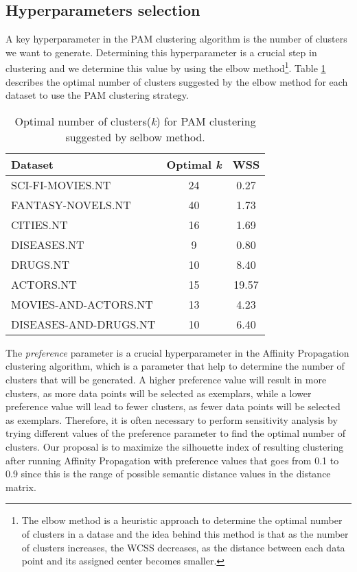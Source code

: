 \documentclass{ieeeaccess}
\begin{document}
\subsection{Hyperparameters selection}

A key hyperparameter in the PAM clustering algorithm is the number of clusters 
we want to generate. Determining this hyperparameter is
a crucial step in clustering and we determine this value by using the elbow 
method\footnote{The elbow method is a heuristic approach to determine the 
optimal number of clusters in a datase and the idea behind this method is that
as the number of clusters increases, the WCSS decreases, as the distance between 
each data point and its assigned center becomes smaller.}. Table \ref{tab:elbow_numbers} describes the optimal number of clusters 
suggested by the elbow method for each dataset to use the PAM clustering strategy.

\begin{table}[!htb]
\caption{Optimal number of clusters(\textit{k}) for PAM clustering suggested by 
selbow method.}
\label{tab:elbow_numbers}
\centering
\begin{tabular}{lcc}
     \toprule
     \textbf{Dataset} & 
     \textbf{Optimal \textit{k}} &
     \textbf{WSS}
     \\
     \midrule
     SCI-FI-MOVIES.NT & 24 & 0.27 \\
     FANTASY-NOVELS.NT & 40 & 1.73 \\
     CITIES.NT & 16 & 1.69 \\
     DISEASES.NT & 9 & 0.80 \\
     DRUGS.NT & 10 & 8.40 \\
     ACTORS.NT & 15 & 19.57 \\
     MOVIES-AND-ACTORS.NT & 13 & 4.23 \\
     DISEASES-AND-DRUGS.NT & 10 & 6.40  \\ 
     \bottomrule
\end{tabular}
\end{table}

The \textit{preference} parameter is a crucial hyperparameter in the Affinity 
Propagation clustering algorithm, which is a parameter that help to 
determine the number of clusters
that will be generated. A higher preference value will result in more 
clusters, as more data points will be selected as exemplars, while a lower 
preference value will lead to fewer clusters, as fewer data points will be 
selected as exemplars. Therefore, it is often necessary to perform
sensitivity analysis by trying different values of the preference parameter 
to find the optimal number of clusters. Our proposal is to maximize the
silhouette index of resulting clustering after running Affinity Propagation 
with preference values that goes from 0.1 to 0.9 since this is the range of 
possible semantic distance values in the distance matrix. 
\end{document}

